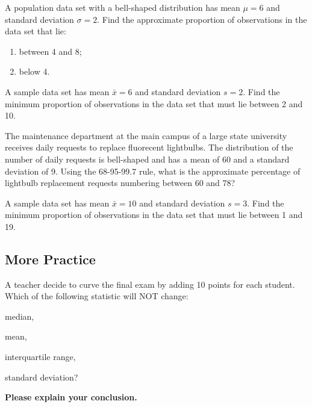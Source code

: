 \begin{example}

A population data set with a bell-shaped distribution has mean
\(\mu = 6\) and standard deviation \(\sigma = 2\). Find the approximate
proportion of observations in the data set that lie:

\begin{enumerate}
\item
  between 4 and 8;
\item
  below 4.
\end{enumerate}

\end{example}

\begin{example}

A sample data set has mean \(\bar{x}=6\) and standard deviation
\(s = 2\). Find the minimum proportion of observations in the data set
that must lie between 2 and 10.

\end{example}
\vspace*{6\baselineskip}

\begin{exercise}

The maintenance department at the main campus of a large state
university receives daily requests to replace fluorecent lightbulbs. The
distribution of the number of daily requests is bell-shaped and has a
mean of 60 and a standard deviation of 9. Using the 68-95-99.7 rule,
what is the approximate percentage of lightbulb replacement requests
numbering between 60 and 78?

\end{exercise}
\vspace*{6\baselineskip}

\begin{exercise}
  A sample data set has mean \(\bar{x}=10\) and standard deviation
  \(s = 3\). Find the minimum proportion of observations in the data set
  that must lie between 1 and 19.
\end{exercise}
\vspace*{6\baselineskip}

\hypertarget{more-practice}{%
\subsection{More Practice}\label{more-practice}}

\begin{exercise}

A teacher decide to curve the final exam by adding 10 points for each
student. Which of the following statistic will NOT change:
\begin{enumerate*}
  \item median, \item mean, \item interquartile range, \item standard deviation?
\end{enumerate*}
\textbf{Please explain your conclusion.}

\end{exercise}
\vspace*{6\baselineskip}

